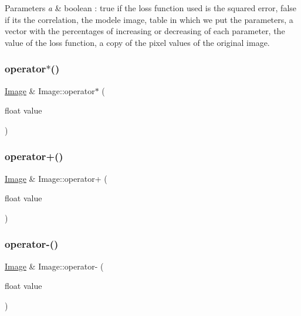 \begin{DoxyParams}{Parameters}
{\em a} & boolean \+: true if the loss function used is the squared error, false if it\textquotesingle{}s the correlation, the modele image, table in which we put the parameters, a vector with the percentages of increasing or decreasing of each parameter, the value of the loss function, a copy of the pixel values of the original image. \\
\hline
\end{DoxyParams}
\mbox{\label{class_image_afbb87a31a42d42c876fb6dcd532b0ba6}} 
\subsubsection{\texorpdfstring{operator$\ast$()}{operator*()}}
{\footnotesize\ttfamily \hyperlink{class_image}{Image} \& Image\+::operator$\ast$ (\begin{DoxyParamCaption}\item[{float}]{value }\end{DoxyParamCaption})}

\mbox{\label{class_image_a05c50340ea69a63d17885753cf553f4a}} 
\subsubsection{\texorpdfstring{operator+()}{operator+()}}
{\footnotesize\ttfamily \hyperlink{class_image}{Image} \& Image\+::operator+ (\begin{DoxyParamCaption}\item[{float}]{value }\end{DoxyParamCaption})}

\mbox{\label{class_image_ac597aa24bd31b8564401e47a4f017a2c}} 
\subsubsection{\texorpdfstring{operator-\/()}{operator-()}}
{\footnotesize\ttfamily \hyperlink{class_image}{Image} \& Image\+::operator-\/ (\begin{DoxyParamCaption}\item[{float}]{value }\end{DoxyParamCaption})}

